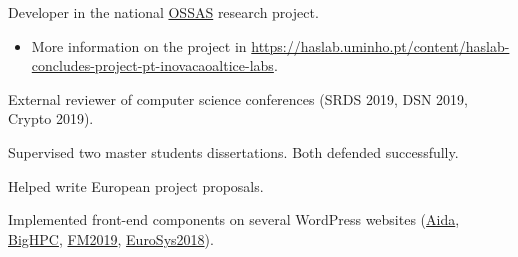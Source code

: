 \begin{cventries}
{\begin{cvitems}
        \item{Developer in the national \href{https://haslab.uminho.pt/content/haslab-concludes-project-pt-inovacaoaltice-labs}{OSSAS} research project.}
        \begin{itemize}
            \item More information on the project in \href{https://haslab.uminho.pt/content/haslab-concludes-project-pt-inovacaoaltice-labs}{https://haslab.uminho.pt/content/haslab-concludes-project-pt-inovacaoaltice-labs}.
        \end{itemize}
        \item{External reviewer of computer science conferences (SRDS 2019, DSN 2019, Crypto 2019).}
        \item{Supervised two master students dissertations. Both defended successfully.}
        \item{Helped write European project proposals.}
        \item {Implemented front-end components on several WordPress websites (\href{https://aida.inesctec.pt}{Aida}, \href{https://bighpc.wavecom.pt}{BigHPC}, \href{http://formalmethods2019.inesctec.pt}{FM2019}, \href{https://eurosys2018.org}{EuroSys2018}).}
      \end{cvitems}
    }
\end{cventries}
